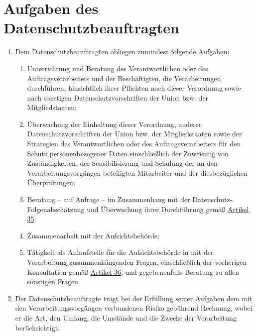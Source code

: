 \chapter{Aufgaben des Datenschutzbeauftragten}
\label{ch:39}


\begin{enumerate}

  \item Dem Datenschutzbeauftragten obliegen zumindest folgende Aufgaben:
  \label{itm:39-1}

  \begin{enumerate}
  
    \item Unterrichtung und Beratung des Verantwortlichen oder des Auftragsverarbeiters und der Beschäftigten, die
     Verarbeitungen durchführen, hinsichtlich ihrer Pflichten nach dieser Verordnung sowie nach sonstigen
     Datenschutzvorschriften der Union bzw. der Mitgliedstaaten;
    \label{itm:39-1a}

    \item Überwachung der Einhaltung dieser Verordnung, anderer Datenschutzvorschriften der Union bzw. der
     Mitgliedstaaten sowie der Strategien des Verantwortlichen oder des Auftragsverarbeiters für den Schutz
     personenbezogener Daten einschließlich der Zuweisung von Zuständigkeiten, der Sensibilisierung und Schulung der an
     den Verarbeitungsvorgängen beteiligten Mitarbeiter und der diesbezüglichen Überprüfungen;
    \label{itm:39-1b}

    \item Beratung -- auf Anfrage -- im Zusammenhang mit der Datenschutz-Folgenabschätzung und Überwachung ihrer
     Durchführung gemäß \hyperref[ch:35]{Artikel 35};
    \label{itm:39-1c}

    \item Zusammenarbeit mit der Aufsichtsbehörde;
    \label{itm:39-1d}

    \item Tätigkeit als Anlaufstelle für die Aufsichtsbehörde in mit der Verarbeitung zusammenhängenden Fragen,
     einschließlich der vorherigen Konsultation gemäß \hyperref[ch:36]{Artikel 36}, und gegebenenfalls Beratung zu
     allen sonstigen Fragen.
    \label{itm:39-1e}

  \end{enumerate}

  \item Der Datenschutzbeauftragte trägt bei der Erfüllung seiner Aufgaben dem mit den Verarbeitungsvorgängen
   verbundenen Risiko gebührend Rechnung, wobei er die Art, den Umfang, die Umstände und die Zwecke der Verarbeitung
   berücksichtigt.
  \label{itm:39-e}

\end{enumerate}


